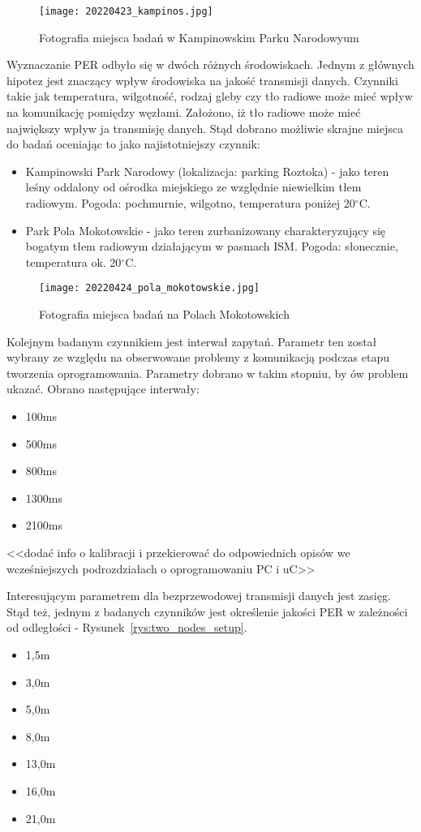 \begin{figure}[!ht]
	\centering \texttt{[image: 20220423\_kampinos.jpg]} 
	\caption{Fotografia miejsca badań w Kampinowskim Parku Narodowyum}
	\label{rys:kampinowski}
\end{figure}

Wyznaczanie PER odbyło się w dwóch różnych środowiskach. Jednym z głównych hipotez jest znaczący wpływ
środowiska na jakość transmisji danych. Czynniki takie jak temperatura, wilgotność, rodzaj gleby czy
tło radiowe może mieć wpływ na komunikację pomiędzy węzłami. Założono, iż tło radiowe może mieć
największy wpływ ja transmisję danych. Stąd dobrano możliwie skrajne miejsca do badań oceniając
to jako najistotniejszy czynnik:
\begin{itemize}
\item Kampinowski Park Narodowy (lokalizacja: parking Roztoka) - jako teren leśny oddalony od ośrodka miejskiego
ze względnie niewielkim tłem radiowym. Pogoda: pochmurnie, wilgotno, temperatura poniżej 20$^{\circ}$C.
\item Park Pola Mokotowskie - jako teren zurbanizowany charakteryzujący się bogatym tłem radiowym działającym
w pasmach \gls{ISM}. Pogoda: słonecznie, temperatura ok. 20$^{\circ}$C.
\end{itemize}

\begin{figure}[!ht]
	\centering \texttt{[image: 20220424\_pola\_mokotowskie.jpg]} 
	\caption{Fotografia miejsca badań na Polach Mokotowskich}
	\label{rys:mokotowskie}
\end{figure}

Kolejnym badanym czynnikiem jest interwał zapytań. Parametr ten został wybrany ze względu na obserwowane
problemy z komunikacją podczas etapu tworzenia oprogramowania. Parametry dobrano w takim stopniu, by ów problem
ukazać. Obrano następujące interwały:
\begin{itemize} \label {items:ping_intervals}
\item 100ms
\item 500ms
\item 800ms
\item 1300ms
\item 2100ms
\end{itemize}
<<dodać info o kalibracji i przekierować do odpowiednich opisów we wcześniejszych podrozdziałach o oprogramowaniu PC i uC>>

Interesującym parametrem dla bezprzewodowej transmisji danych jest zasięg. Stąd też, jednym z badanych czynników jest
określenie jakości PER w zależności od odległości - Rysunek~\ref{rys:two_nodes_setup}.
\begin{itemize}
\item 1,5m
\item 3,0m
\item 5,0m
\item 8,0m
\item 13,0m
\item 16,0m
\item 21,0m
\end{itemize}


